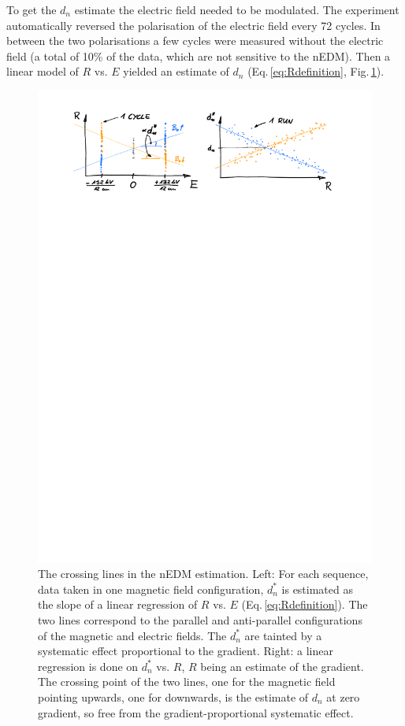 To get the $d_n$ estimate the electric field needed to be modulated. The experiment automatically reversed the polarisation of the electric field every 72 cycles. In between the two polarisations a few cycles were measured without the electric field (a total of 10\% of the data, which are not sensitive to the nEDM). Then a linear model of  $R$ vs. $E$ yielded an estimate of $d_n$ (Eq.\,\ref{eq:Rdefinition}, Fig.\,\ref{fig:crossing_lines}).

\begin{figure}
  \centering
  \includegraphics[width=0.9\linewidth]{gfx/nEDMatPSI/crossing_lines.pdf}
  \caption{The crossing lines in the nEDM estimation. Left: For each sequence, data taken in one magnetic field configuration, $d_n^*$ is estimated as the slope of a linear regression of $R$ vs. $E$ (Eq.\,\ref{eq:Rdefinition}). The two lines correspond to the parallel and anti-parallel configurations of the magnetic and electric fields. The $d_n^*$ are tainted by a systematic effect proportional to the gradient. Right: a linear regression is done on $d_n^*$ vs. $R$, $R$ being an estimate of the gradient. The crossing point of the two lines, one for the magnetic field pointing upwards, one for downwards, is the estimate of $d_n$ at zero gradient, so free from the gradient-proportional systematic effect.}
  \label{fig:crossing_lines}
\end{figure}

